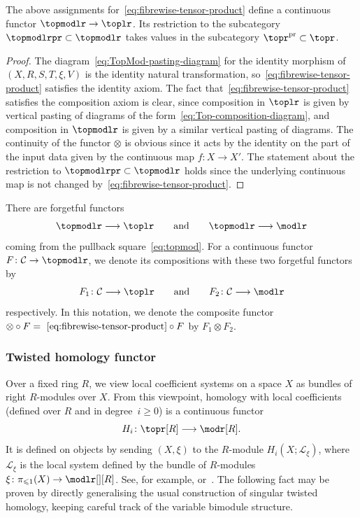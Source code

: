 \documentclass[AHL,Unicode,published]{cedram}
\newcommand{\pr}{\ensuremath{\mathrm{pr}}}
\newcommand{\cC}{\mathcal{C}}
\newcommand{\cL}{\mathcal{L}}
\newcommand{\too}{\ensuremath{\longrightarrow}}
\renewcommand{\geq}{\geqslant}
\renewcommand{\leq}{\leqslant}
\begin{document}
\begin{lemm}
The above assignments for~\eqref{eq:fibrewise-tensor-product} define a continuous functor $\topmodlr \to \toplr$. Its restriction to the subcategory $\topmodlrpr \subset \topmodlr$ takes values in the subcategory $\topr^{\pr} \subset \topr$.
\end{lemm}
\begin{proof}
The diagram~\eqref{eq:TopMod-pasting-diagram} for the identity morphism of $(X,R,S,T,\xi,V)$ is the identity natural transformation, so~\eqref{eq:fibrewise-tensor-product} satisfies the identity axiom. The fact that~\eqref{eq:fibrewise-tensor-product} satisfies the composition axiom is clear, since composition in $\toplr$ is given by vertical pasting of diagrams of the form~\eqref{eq:Top-composition-diagram}, and composition in $\topmodlr$ is given by a similar vertical pasting of diagrams. The continuity of the functor $\otimes$ is obvious since it acts by the identity on the part of the input data given by the continuous map $f \colon X \to X'$. The statement about the restriction to $\topmodlrpr \subset \topmodlr$ holds since the underlying continuous map is not changed by~\eqref{eq:fibrewise-tensor-product}.
\end{proof}

\begin{notation}\label{r:tensor-notation}
There are forgetful functors
\[
\topmodlr \too \toplr \qquad\text{and}\qquad \topmodlr \too \modlr
\]
coming from the pullback square~\eqref{eq:topmod}. For a continuous functor $F \colon \cC \to \topmodlr$, we denote its compositions with these two forgetful functors by
\[
F_{1} \colon \cC \too \toplr \qquad\text{and}\qquad F_{2} \colon \cC \too \modlr
\]
respectively. In this notation, we denote the composite functor $\otimes \circ F =~\eqref{eq:fibrewise-tensor-product} \circ F$ by $F_{1} \otimes F_{2}$.
\end{notation}


\subsubsection{Twisted homology functor}\label{sss:twisted-homology}

Over a fixed ring $R$, we view local coefficient systems on a space $X$ as bundles of right $R$-modules over $X$. From this viewpoint, homology with local coefficients (defined over $R$ and in degree~$i\geq 0$) is a continuous functor
\begin{equation}\label{eq:twisted-homology-R}
H_{i} \colon \topr[R] \too \modr[R].
\end{equation}
It is defined on objects by sending $(X,\xi)$ to the $R$-module $H_{i}(X;\cL_{\xi})$, where $\cL_{\xi}$ is the local system defined by the bundle of $R$-modules $\xi\colon \pi_{\leq 1}(X)\to \modlr[][R]$. See, for example, \cite[\S~5.4]{daviskirk} or~\cite[\S~5.1]{Palmer2018Twistedhomologicalstability}. The following fact may be proven by directly generalising the usual construction of singular twisted homology, keeping careful track of the variable bimodule structure.
\end{document}
